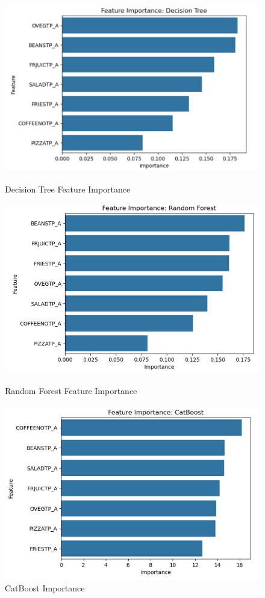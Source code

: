 \documentclass{article}
\begin{document}
\begin{figure}[h!]
	\centering
	\begin{minipage}{0.32\textwidth}
		\centering
		\includegraphics[width=0.9\linewidth]{../Image/P31.jpg}
		\caption{Decision Tree Feature Importance}
		\label{fig:P31}
	\end{minipage}\hfill
	\begin{minipage}{0.32\textwidth}
		\centering
		\includegraphics[width=0.9\linewidth]{../Image/P32.jpg}
		\caption{Random Forest Feature Importance}
		\label{fig:P32}
	\end{minipage}\hfill
	\begin{minipage}{0.32\textwidth}
		\centering
		\includegraphics[width=0.9\linewidth]{../Image/P33.jpg}
		\caption{CatBoost Importance}
		\label{fig:P33}
	\end{minipage}
\end{figure}
\end{document}
